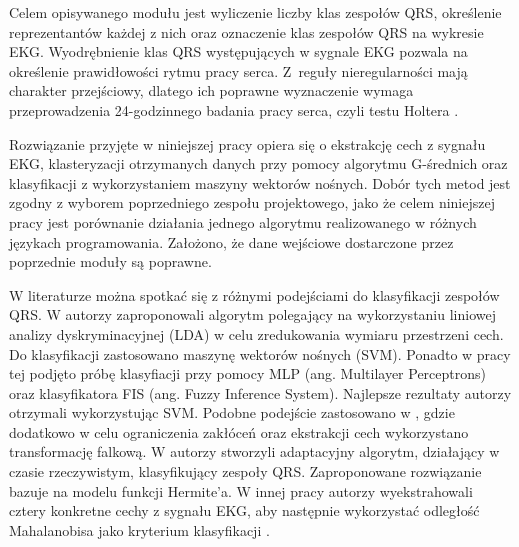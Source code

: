 Celem opisywanego modułu jest wyliczenie liczby klas zespołów QRS, określenie reprezentantów każdej z nich oraz oznaczenie klas zespołów QRS na wykresie EKG. Wyodrębnienie klas QRS występujących w sygnale EKG pozwala na określenie prawidłowości rytmu pracy serca. Z~reguły nieregularności mają charakter przejściowy, dlatego ich poprawne wyznaczenie wymaga przeprowadzenia 24-godzinnego badania pracy serca, czyli testu Holtera \cite{RaportKoncowy}.

Rozwiązanie przyjęte w niniejszej pracy opiera się o ekstrakcję cech z sygnału EKG, klasteryzacji otrzymanych danych przy pomocy algorytmu G-średnich oraz klasyfikacji z wykorzystaniem maszyny wektorów nośnych. Dobór tych metod jest zgodny z wyborem poprzedniego zespołu projektowego, jako że celem niniejszej pracy jest porównanie działania jednego algorytmu realizowanego w różnych językach programowania.
Założono, że dane wejściowe dostarczone przez poprzednie moduły są poprawne.

W literaturze można spotkać się z różnymi podejściami do klasyfikacji zespołów QRS. W \cite{SVMBasedArrhythmiaClassification} autorzy zaproponowali algorytm polegający na wykorzystaniu liniowej analizy dyskryminacyjnej (LDA) w celu zredukowania wymiaru przestrzeni cech. Do klasyfikacji zastosowano maszynę wektorów nośnych (SVM). Ponadto w pracy tej podjęto próbę klasyfiacji przy pomocy MLP (ang. Multilayer Perceptrons) oraz klasyfikatora FIS (ang. Fuzzy Inference System). Najlepsze rezultaty autorzy otrzymali wykorzystując SVM. Podobne podejście zastosowano w \cite{Abhishek}, gdzie dodatkowo w celu ograniczenia zakłóceń oraz ekstrakcji cech wykorzystano transformację falkową. 
W \cite{Laguna} autorzy stworzyli adaptacyjny algorytm, działający w czasie rzeczywistym, klasyfikujący zespoły QRS. Zaproponowane rozwiązanie bazuje na modelu funkcji Hermite'a. 
W innej pracy autorzy wyekstrahowali cztery konkretne cechy z sygnału EKG, aby następnie wykorzystać odległość Mahalanobisa jako kryterium klasyfikacji \cite{Moreas}.
